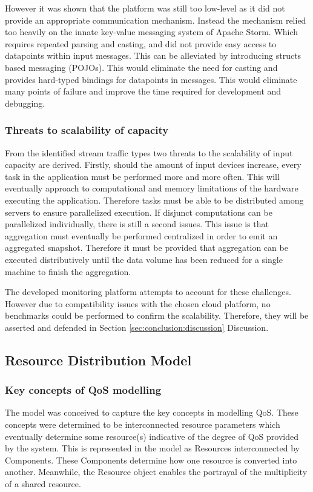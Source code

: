 However it was shown that the platform was still too low-level as it did not provide an appropriate communication mechanism. Instead the mechanism relied too heavily on the innate key-value messaging system of Apache Storm. Which requires repeated parsing and casting, and did not provide easy access to datapoints within input messages. This can be alleviated by introducing structs based messaging (POJOs). This would eliminate the need for casting and provides hard-typed bindings for datapoints in messages. This would eliminate many points of failure and improve the time required for development and debugging.

\subsubsection{Threats to scalability of capacity}
From the identified stream traffic types two threats to the scalability of input capacity are derived. Firstly, should the amount of input devices increase, every task in the application must be performed more and more often. This will eventually approach to computational and memory limitations of the hardware executing the application. Therefore tasks must be able to be distributed among servers to ensure parallelized execution. If disjunct computations can be parallelized individually, there is still a second issues. This issue is that aggregation must eventually be performed centralized in order to emit an aggregated snapshot. Therefore it must be provided that aggregation can be executed distributively until the data volume has been reduced for a single machine to finish the aggregation.

The developed monitoring platform attempts to account for these challenges. However due to compatibility issues with the chosen cloud platform, no benchmarks could be performed to confirm the scalability. Therefore, they will be asserted and defended in Section \ref{sec:conclusion:discussion} Discussion.


\subsection{Resource Distribution Model}
\subsubsection{Key concepts of QoS modelling}
The model was conceived to capture the key concepts in modelling QoS. These concepts were determined to be interconnected resource parameters which eventually determine some resource(s) indicative of the degree of QoS provided by the system. This is represented in the model as Resources interconnected by Components. These Components determine how one resource is converted into another. Meanwhile, the Resource object enables the portrayal of the multiplicity of a shared resource. 

